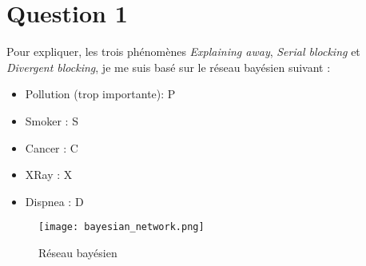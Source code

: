 \documentclass[12pt]{article}
\begin{document}
\section{Question 1}
Pour expliquer, les trois phénomènes \textit{Explaining away}, \textit{Serial blocking} et \textit{Divergent blocking}, je me suis basé sur le réseau bayésien suivant : 
\begin{itemize}
\item Pollution (trop importante): P
\item Smoker : S
\item Cancer : C
\item XRay : X
\item Dispnea : D
\end{itemize}
\begin{figure}[H]
\begin{center}
  \texttt{[image: bayesian\_network.png]}
  \caption{Réseau bayésien}
  \label{fig:reseau_bayesien}
\end{center}
\end{figure}
\end{document}
